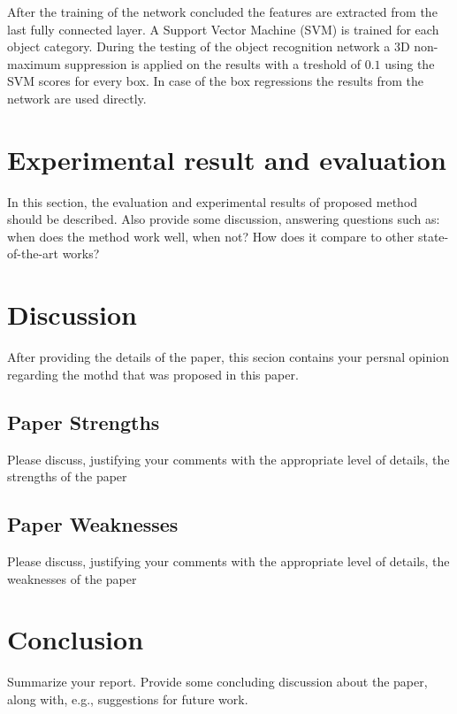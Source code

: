 \documentclass[12pt]{scrartcl}
\begin{document}
After the training of the network concluded the features are extracted from the last
fully connected layer. A Support Vector Machine (SVM) is trained for each object
category. During the testing of the object recognition network a 3D non-maximum
suppression is applied on the results with a treshold of \(0.1\) using the SVM
scores for every box. In case of the box regressions the results from the network
are used directly.

\section{Experimental result and evaluation}
In this section, the evaluation and experimental results of proposed method should be described.
Also provide some discussion, answering questions such as: when does the method work well, when not? How does it compare to other state-of-the-art works?

\section{Discussion} %
\label{sec:discussion}
After providing the details of the paper, this secion contains your persnal opinion regarding the mothd that was proposed in this paper.
\subsection{Paper Strengths} %
\label{sub:paper_strengths}
Please discuss, justifying your comments with the appropriate level of details, the strengths of the paper

\subsection{Paper Weaknesses} %
\label{sub:paper_weaknesses}
Please discuss, justifying your comments with the appropriate level of details, the weaknesses of the paper


\section{Conclusion}
Summarize your report.
Provide some concluding discussion about the paper, along with, e.g., suggestions for future work.


\newpage
\printbibliography
{}%
\end{document}
